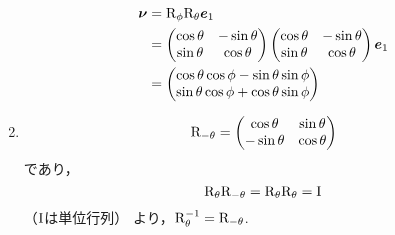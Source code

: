 \begin{enumerate}[label=(\roman*)]
      \begin{align}
        \boldsymbol{\nu} &= \mathrm{R}_\phi \mathrm{R}_\theta \boldsymbol{e}_1 \\
          &=
          \begin{pmatrix}
            \cos\theta & -\sin\theta \\
            \sin\theta & \cos\theta
          \end{pmatrix}
          \begin{pmatrix}
            \cos\theta & -\sin\theta \\
            \sin\theta & \cos\theta
          \end{pmatrix}
          \boldsymbol{e}_1\\
          &=
          \begin{pmatrix}
            \cos\theta \cos\phi - \sin\theta \sin\phi \\
            \sin\theta \cos\phi + \cos\theta \sin\phi
          \end{pmatrix}
      \end{align}
    \item
      \begin{equation}
        \mathrm{R}_{-\theta} 
          =
          \begin{pmatrix}
            \cos\theta  & \sin\theta \\
            -\sin\theta & \cos\theta
          \end{pmatrix}
      \end{equation}
      であり，
      \begin{equation}
        \mathrm{R}_\theta \mathrm{R}_{-\theta} = \mathrm{R}_{\theta} \mathrm{R}_\theta = \mathrm{I}
      \end{equation}
      （$\mathrm{I}$は単位行列）
      より，$\mathrm{R}_\theta^{-1} = \mathrm{R}_{-\theta}$.
  \end{enumerate}


\clearpage
